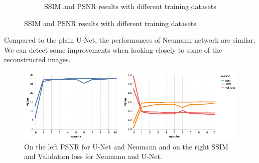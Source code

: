 \documentclass{article}
\begin{document}
\begin{figure}[H]
\begin{subfigure}[b]{.5\textwidth}
		\caption{SSIM and PSNR results with different training datasets}
    \end{subfigure}%
\end{figure}

Compared to the plain U-Net, the performances of Neumann network are similar. We can detect some improvements when looking closely to some of the  reconstructed images.
	\begin{figure}[H]
		\centering
		\captionsetup{justification=centering}
		\includegraphics[width=\textwidth]{unet_neumann}
		\caption{On the left PSNR for U-Net and Neumann and on the right SSIM and Validation loss for Neumann and U-Net.}
	\end{figure}
\end{document}
